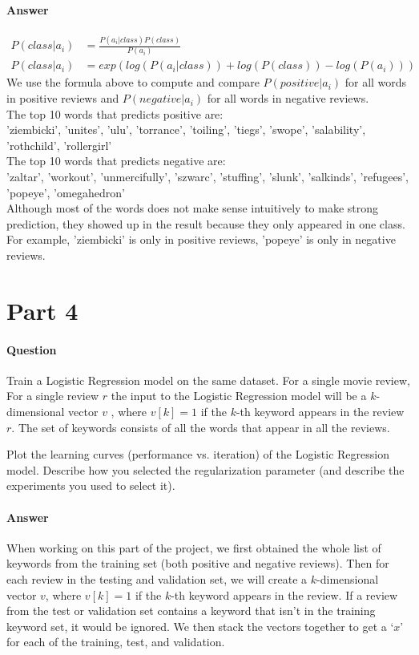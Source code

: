 \documentclass[11pt,twoside]{article}
\begin{document}
\paragraph{Answer}
\begin{align*}
P(class | a_i) &= \frac{P(a_i | class) P(class)}{P(a_i)}\\
P(class | a_i) &= exp(log(P(a_i | class)) + log(P(class)) - log(P(a_i)))
\end{align*}
We use the formula above to compute and compare $P(positive | a_i)$ for all words in positive reviews and $P(negative | a_i)$ for all words in negative reviews.\\
The top 10 words that predicts positive are:\\
'ziembicki', 'unites', 'ulu', 'torrance', 'toiling', 'tiegs', 'swope', 'salability', 'rothchild', 'rollergirl'\\
The top 10 words that predicts negative are:\\
'zaltar', 'workout', 'unmercifully', 'szwarc', 'stuffing', 'slunk', 'salkinds', 'refugees', 'popeye', 'omegahedron'\\
Although most of the words does not make sense intuitively to make strong prediction, they showed up in the result because they only appeared in one class. For example, 'ziembicki' is only in positive reviews, 'popeye' is only in negative reviews.
\clearpage

\section*{Part 4}
\paragraph{Question}
Train a Logistic Regression model on the same dataset. For a single movie review, For a single review $r$ the input to the Logistic Regression model will be a $k$-dimensional vector $v$ , where $v[k]=1$ if the $k$-th keyword appears in the review $r$. The set of keywords consists of all the words that appear in all the reviews.

Plot the learning curves (performance vs. iteration) of the Logistic Regression model. Describe how you selected the regularization parameter (and describe the experiments you used to select it).

\paragraph{Answer}
When working on this part of the project, we first obtained the whole list of keywords from the training set (both positive and negative reviews). Then for each review in the testing and validation set, we will create a $k$-dimensional vector $v$, where $v[k]=1$ if the $k$-th keyword appears in the review. If a review from the test or validation set contains a keyword that isn't in the training keyword set, it would be ignored. We then stack the vectors together to get a `$x$' for each of the training, test, and validation. 
\end{document}
